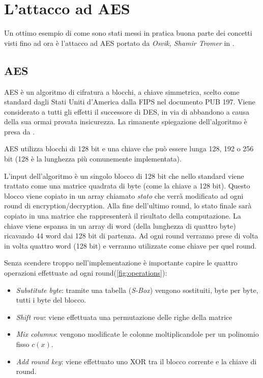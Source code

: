 		\section{L'attacco ad AES}
			Un ottimo esempio di come sono stati messi in pratica buona parte dei concetti visti fino ad ora è l'attacco ad \ac{AES} portato da \emph{Osvik, Shamir  Tromer} in \cite{osvik2006cache}.
			
			\subsection{AES}
				\ac{AES} è un algoritmo di cifratura a blocchi, a chiave simmetrica, scelto come standard dagli Stati Uniti d'America dalla \ac{FIPS} nel documento PUB 197\cite{pub2001197}. Viene considerato a tutti gli effetti il successore di \ac{DES}, in via di abbandono a causa della sua ormai provata insicurezza\cite{kumar2006breaking,gilmore1998cracking}. La rimanente spiegazione dell'algoritmo è presa da \cite{stallings2012computer}.
				
				\ac{AES} utilizza blocchi di 128 bit e una chiave che può essere lunga 128, 192 o 256 bit (128 è la lunghezza più comunemente implementata).
			
				L'input dell'algoritmo è un singolo blocco di 128 bit che nello standard viene trattato come una matrice quadrata di byte (come la chiave a 128 bit). Questo blocco viene copiato in un array chiamato \emph{stato} che verrà modificato ad ogni round di encryption/decryption. Alla fine dell'ultimo round, lo stato finale sarà copiato in una matrice che rappresenterà il risultato della computazione. La chiave viene espansa in un array di word (della lunghezza di quattro byte) ricavando 44 word dai 128 bit di partenza. Ad ogni round verranno prese di volta in volta quattro word (128 bit) e verranno utilizzate come chiave per quel round.
				
				Senza scendere troppo nell'implementazione è importante capire le quattro operazioni effettuate ad ogni round(\cref{fig:operations}):
				
				\begin{itemize}
					\item \emph{Substitute byte}: tramite una tabella (\emph{S-Box}) vengono sostituiti, byte per byte, tutti i byte del blocco.
					\item \emph{Shift row}: viene effettuata una permutazione delle righe della matrice
					\item \emph{Mix columns}: vengono modificate le colonne moltiplicandole per un polinomio fisso $c(x)$.
					\item \emph{Add round key}: viene effettuato uno XOR tra il blocco corrente e la chiave di round.
				\end{itemize}
			
